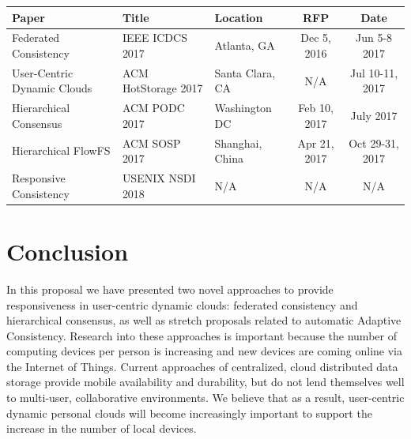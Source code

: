 \documentclass{article}
\begin{document}
\begin{center}
\begin{tabular}{|l|l|l|c|c|}
\hline
Paper & Title & Location & RFP & Date \\
\hline
Federated Consistency & IEEE ICDCS 2017 & Atlanta, GA & Dec 5, 2016 & Jun 5-8 2017 \\

User-Centric Dynamic Clouds & ACM HotStorage 2017 & Santa Clara, CA & N/A & Jul 10-11, 2017 \\

Hierarchical Consensus & ACM PODC 2017 & Washington DC & Feb 10, 2017 & July 2017 \\

Hierarchical FlowFS & ACM SOSP 2017 & Shanghai, China & Apr 21, 2017 & Oct 29-31, 2017 \\

Responsive Consistency & USENIX NSDI 2018 & N/A & N/A & N/A \\

\hline
\end{tabular}
\end{center}

\section{Conclusion}
\label{sec:conclusion}

In this proposal we have presented two novel approaches to provide responsiveness in user-centric dynamic clouds: federated consistency and hierarchical consensus, as well as stretch proposals related to automatic Adaptive Consistency. Research into these approaches is important because the number of computing devices per person is increasing and new devices are coming online via the Internet of Things. Current approaches of centralized, cloud distributed data storage provide mobile availability and durability, but do not lend themselves well to multi-user, collaborative environments. We believe that as a result, user-centric dynamic personal clouds will become increasingly important to support the increase in the number of local devices.
\end{document}
